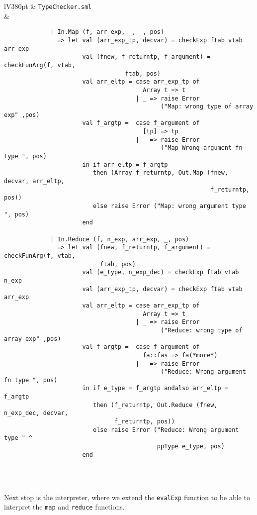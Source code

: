 \documentclass[a4paper]{article}
\begin{document}
\begin{center}	
	\begin{tabular}{lV{380pt}}
		\toprule
		& \verb|TypeChecker.sml|\\
		\midrule
		&
		\begin{verbatim}
			 | In.Map (f, arr_exp, _, _, pos)
			   => let val (arr_exp_tp, decvar) = checkExp ftab vtab arr_exp
			          val (fnew, f_returntp, f_argument) = checkFunArg(f, vtab, 
			                      ftab, pos)
			          val arr_eltp = case arr_exp_tp of
			                           Array t => t
			                         | _ => raise Error
			                                ("Map: wrong type of array exp" ,pos)
			          val f_argtp =  case f_argument of
			                           [tp] => tp
			                         | _ => raise Error 
			                                ("Map Wrong argument fn type ", pos)
			          in if arr_eltp = f_argtp
			             then (Array f_returntp, Out.Map (fnew, decvar, arr_eltp, 
			                                              f_returntp, pos))
			             else raise Error ("Map: wrong argument type ", pos)
			          end
			 
			 | In.Reduce (f, n_exp, arr_exp, _, pos)
			   => let val (fnew, f_returntp, f_argument) = checkFunArg(f, vtab, 
			               ftab, pos)
			          val (e_type, n_exp_dec) = checkExp ftab vtab n_exp
			          val (arr_exp_tp, decvar) = checkExp ftab vtab arr_exp
			          val arr_eltp = case arr_exp_tp of
			                           Array t => t
			                         | _ => raise Error 
			                                ("Reduce: wrong type of array exp" ,pos)
			          val f_argtp =  case f_argument of
			                           fa::fas => fa(*more*)
			                         | _ => raise Error 
			                                ("Reduce: Wrong argument fn type ", pos)
			          in if e_type = f_argtp andalso arr_eltp = f_argtp
			             then (f_returntp, Out.Reduce (fnew, n_exp_dec, decvar, 
			                   f_returntp, pos))
			             else raise Error ("Reduce: Wrong argument type " ^ 
			                               ppType e_type, pos)
			          end
		\end{verbatim}
		\\
		\bottomrule \\
	\end{tabular}
\end{center}
	
Next stop is the interpreter, where we extend the \verb|evalExp| function to be able to interpret the \verb|map| and \verb|reduce| functions.
	
\end{document}
